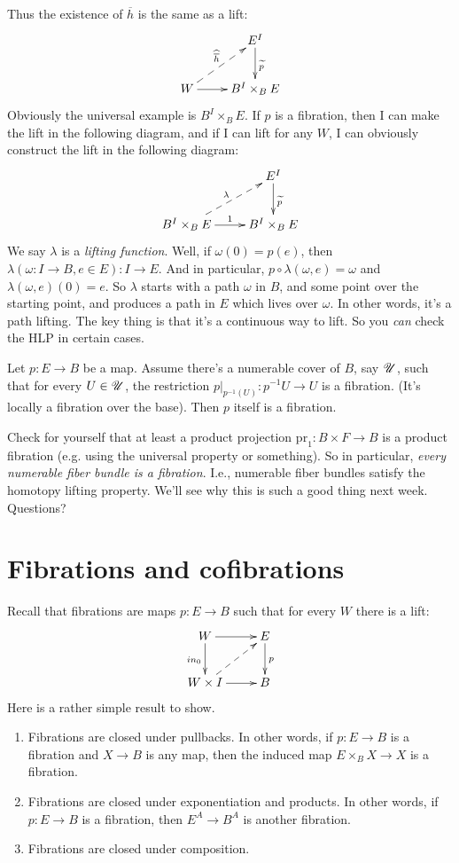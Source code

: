 Thus the existence of $\overline{h}$ is the same as a lift:
\begin{equation*}
    \xymatrix{
	& E^I\ar[d]^{\widetilde{p}}\\
	W\ar[r]\ar@{-->}[ur]^{\widehat{\overline{h}}} & B^I\times_B E
    }
\end{equation*}
Obviously the universal example is $B^I\times_B E$. If $p$ is a fibration, then I can make the lift in the following diagram, and if I can lift for any $W$, I can obviously construct the lift in the following diagram:
\begin{equation*}
    \xymatrix{
	& E^I\ar[d]^{\widetilde{p}}\\
	B^I\times_B E\ar@{-->}[ur]^\lambda\ar[r]^1 & B^I\times_B E
    }
\end{equation*}
We say $\lambda$ is a \emph{lifting function}. Well, if $\omega(0) = p(e)$, then $\lambda(\omega:I\to B, e\in E):I\to E$. And in particular, $p\circ\lambda(\omega, e) = \omega$ and $\lambda(\omega,e)(0) = e$. So $\lambda$ starts with a path $\omega$ in $B$, and some point over the starting point, and produces a path in $E$ which lives over $\omega$. In other words, it's a path lifting. The key thing is that it's a continuous way to lift. So you \emph{can} check the HLP in certain cases.
\begin{theorem}[Dold]
    Let $p:E\to B$ be a map. Assume there's a numerable cover of $B$, say $\mathscr U$, such that for every $U\in\mathscr U$, the restriction $p|_{p^{-1}(U)}:p^{-1}U\to U$ is a fibration. (It's locally a fibration over the base). Then $p$ itself is a fibration.
\end{theorem}
Check for yourself that at least a product projection $\mathrm{pr}_1:B\times F\to B$ is a product fibration (e.g. using the universal property or something). So in particular, \emph{every numerable fiber bundle is a fibration}. I.e., numerable fiber bundles satisfy the homotopy lifting property. We'll see why this is such a good thing next week. Questions?
\chapter{Fibrations and cofibrations}
Recall that fibrations are maps $p:E\to B$ such that for every $W$ there is a lift:
\begin{equation*}
    \xymatrix{
	W\ar[r]\ar[d]_{in_0} & E\ar[d]^p\\
	W\times I\ar[r]\ar@{-->}[ur] & B
    }
\end{equation*}
Here is a rather simple result to show.
\begin{prop}
    \begin{enumerate}
	\item Fibrations are closed under pullbacks. In other words, if $p:E\to B$ is a fibration and $X\to B$ is any map, then the induced map $E\times_B X\to X$ is a fibration.
	\item Fibrations are closed under exponentiation and products. In other words, if $p:E\to B$ is a fibration, then $E^A\to B^A$ is another fibration.
	\item Fibrations are closed under composition.
    \end{enumerate}
\end{prop}
